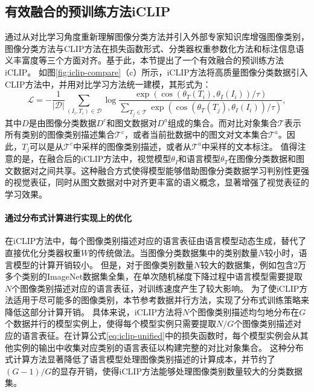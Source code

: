 \subsection{有效融合的预训练方法iCLIP}
\label{sec:iclip-unify}
通过从对比学习角度重新理解图像分类方法并引入外部专家知识库增强图像类别，图像分类方法与CLIP方法在损失函数形式、分类器权重参数化方法和标注信息语义丰富度等三个方面对齐。基于此，本节提出了一个有效融合的预训练方法iCLIP。
如图\ref{fig:iclip-compare}（c）所示，iCLIP方法将高质量图像分类数据引入CLIP方法中，并用对比学习方法统一建模，其形式为：
\begin{equation}
   \mathcal{L}=-\frac{1}{|\mathcal{D}|} \sum_{\left(I_{i}, T_{i}\right) \in \mathcal{D}} \log \frac{\exp \left(\cos \left(\theta_{T}(T_{i}), \theta_{I}(I_{i})\right) / \tau\right)}{\sum_{T_{j} \in \mathcal{T}} \exp \left(\cos \left(\theta_{T}(T_{j}), \theta_{I}(I_{i})\right) / \tau\right)},
   \label{eq:iclip-unified}
\end{equation}
其中$D$是由图像分类数据$D^{c}$和图文数据对$D^{a}$组成的集合。而对比对象集合$\mathcal{T}$表示所有类别的图像类别描述集合$\mathcal{T}^{c}$，或者当前批数据中的图文对文本集合$\mathcal{T}^{a}$。因此，$T_{j}$可以是从$\mathcal{T}^{c}$中采样的图像类别描述，或者从$\mathcal{T}^{a}$中采样的文本标注。
值得注意的是，在融合后的iCLIP方法中，视觉模型$\theta_{I}$和语言模型$\theta_{T}$在图像分类数据和图文数据对之间共享。这种融合方式使得模型能够借助图像分类数据学习判别性更强的视觉表征，同时从图文数据对中对齐更丰富的语义概念，显著增强了视觉表征的学习效果。

\paragraph{通过分布式计算进行实现上的优化} 在iCLIP方法中，每个图像类别描述对应的语言表征由语言模型动态生成，替代了直接优化分类器权重$W$的传统做法。当图像分类数据集中的类别数量$N$较小时，语言模型的计算开销较小。
但是，对于图像类别数量$N$较大的数据集，例如包含2万多个类别的ImageNet数据集全集，在单次随机梯度下降过程中语言模型需要提取$N$个图像类别描述对应的语言表征，对训练速度产生了较大影响。
为了使iCLIP方法适用于尽可能多的图像类别，本节参考数据并行方法\cite{chen2020simple}，实现了分布式训练策略来降低这部分计算开销。
具体来说，iCLIP方法将$N$个图像类别描述均匀地分布在$G$个数据并行的模型实例上，使得每个模型实例只需要提取$N/G$个图像类别描述对应的语言表征。在计算公式\eqref{eq:iclip-unified}中的损失函数时，每个模型实例会从其他实例的输出中收集对应类别的语言表征以构建完整的对比对象集合。
这种分布式计算方法显著降低了语言模型处理图像类别描述的计算成本，并节约了$(G-1)/G$的显存开销，使得iCLIP方法能够处理图像类别数量较大的分类数据集。

